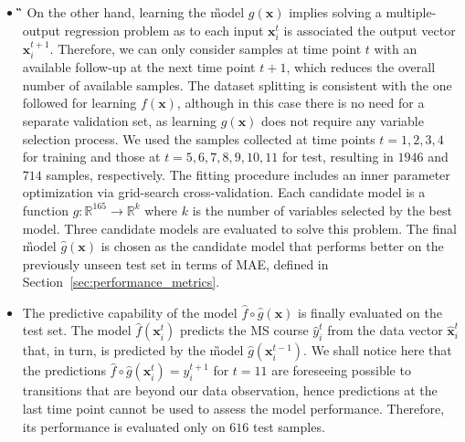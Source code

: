 \begin{itemize}
	\item[] \textbf{\G} %
	On the other hand, learning the \G model $g(\bm{x})$ implies solving a multiple-output regression problem as to each input $\bm{x}_i^t$ is associated the output vector $\bm{x}_i^{t+1}$.
	Therefore, we can only consider samples at time point $t$ with an available follow-up at the next time point $t+1$, which reduces the overall number of available samples.
	The dataset splitting is consistent with the one followed for learning $f(\bm{x})$, although in this case there is no need for a separate validation set, as learning $g(\bm{x})$ does not require any variable selection process. We used the samples collected at time points $t=1,2,3,4$ for training and those at $t=5,6,7,8,9,10,11$ for test, resulting in $1946$ and $714$ samples, respectively.
	The fitting procedure includes an inner parameter optimization via grid-search cross-validation. Each candidate model is a function
	$g: \mathbb{R}^{165} \rightarrow \mathbb{R}^k$ where $k$ is the number of variables selected by the best \F model.
	Three candidate models are evaluated to solve this problem.
	The final \G model $\hat{g}(\bm{x})$ is chosen as the candidate model that performs better on the previously unseen test set in terms of MAE, defined in Section~\ref{sec:performance_metrics}.
	

	\item[] \textbf{\FOG} The predictive capability of the \FOG model $\hat{f} \circ \hat{g}(\bm{x})$ is finally evaluated on the test set. The \F model $\hat{f}(\bm{x}_i^t)$ predicts the MS course $\hat{y}_i^t$ from the \PCO data vector $\hat{\bm{x}}_i^t$ that, in turn, is predicted by the \G model $\hat{g}(\bm{x}_i^{t-1})$. We shall notice here that the predictions $\hat{f} \circ \hat{g}(\bm{x}_i^t)=y_i^{t+1}$ for $t=11$ are foreseeing possible \RR to \SP transitions that are beyond our data observation, hence predictions at the last time point cannot be used to assess the \FOG model performance. Therefore, its performance is evaluated only on $616$ test samples.
	
\end{itemize}







